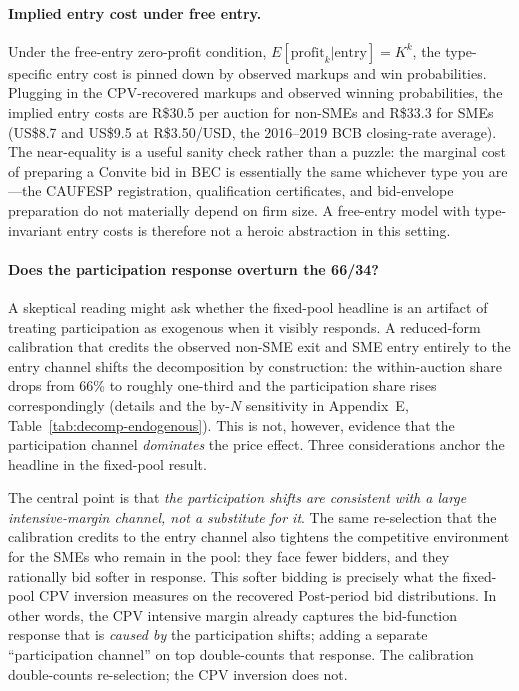 \documentclass[12pt]{article}
\begin{document}
\paragraph{Implied entry cost under free entry.}
Under the \citet{atheyseira2011} free-entry zero-profit condition,
$E[\text{profit}_k | \text{entry}] = K^k$, the type-specific entry
cost is pinned down by observed markups and win probabilities.
Plugging in the CPV-recovered markups and observed winning
probabilities, the implied entry costs are R\$30.5 per auction
for non-SMEs and R\$33.3 for SMEs (US\$8.7 and US\$9.5 at R\$3.50/USD,
the 2016--2019 BCB closing-rate average). The near-equality is a useful
sanity check rather than a puzzle: the marginal cost of preparing
a Convite bid in BEC is essentially the same whichever type you
are---the CAUFESP registration, qualification certificates, and
bid-envelope preparation do not materially depend on firm size.
A free-entry model with type-invariant entry costs is therefore
not a heroic abstraction in this setting.

\paragraph{Does the participation response overturn the 66/34?}
A skeptical reading might ask whether the fixed-pool headline is
an artifact of treating participation as exogenous when it
visibly responds. A reduced-form calibration that credits the
observed non-SME exit and SME entry entirely to the entry channel
shifts the decomposition by construction: the within-auction
share drops from 66\% to roughly one-third and the participation
share rises correspondingly (details and the by-$N$ sensitivity
in Appendix~E, Table~\ref{tab:decomp-endogenous}). This is not,
however, evidence that the participation channel \emph{dominates}
the price effect. Three considerations anchor the headline in the
fixed-pool result.

The central point is that \emph{the participation shifts are
consistent with a large intensive-margin channel, not a substitute
for it}. The same re-selection that the calibration credits to
the entry channel also tightens the competitive environment for
the SMEs who remain in the pool: they face fewer bidders, and
they rationally bid softer in response. This softer bidding is
precisely what the fixed-pool CPV inversion measures on the
recovered Post-period bid distributions. In other words, the
CPV intensive margin already captures the bid-function response
that is \emph{caused by} the participation shifts; adding a
separate ``participation channel'' on top double-counts that
response. The calibration double-counts re-selection; the CPV
inversion does not.
\end{document}
